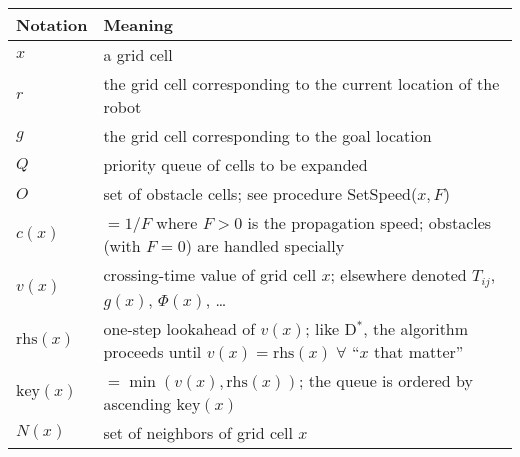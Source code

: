 \documentclass[twocolumn]{article}
\newcommand{\rhs}{\text{rhs}}
\newcommand{\key}{\text{key}}
\begin{document}
\begin{table}
  \centering
  \begin{tabular}{@{}p{}p{}@{}}
    \toprule
    Notation & Meaning \\
    \midrule
    $x$       & a grid cell \\
    $r$       & the grid cell corresponding to the current location of the robot \\
    $g$       & the grid cell corresponding to the goal location \\
    $Q$       & priority queue of cells to be expanded \\
    $O$       & set of obstacle cells; see procedure SetSpeed($x, F$) \\
    $c(x)$    & $=1/F$ where $F>0$ is the propagation speed; obstacles (with $F=0$) are handled specially \\
    $v(x)$    & crossing-time value of grid cell $x$; elsewhere denoted $T_{ij}$, $g(x)$, $\Phi(x)$, \ldots \\
    $\rhs(x)$ & one-step lookahead of $v(x)$; like D$^\ast$, the algorithm proceeds until $v(x) = \rhs(x) \;\forall$ ``$x$ that matter'' \\
    $\key(x)$ &  $= \min (v(x), \rhs(x))$; the queue is ordered by ascending $\key(x)$ \\
    $N(x)$    & set of neighbors of grid cell $x$ \\
    \bottomrule
  \end{tabular}
\end{table}
\end{document}
